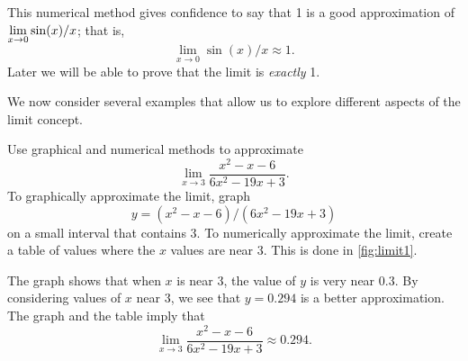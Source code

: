 This numerical method gives confidence to say that 1 is a good approximation of $\displaystyle\lim_{x\to 0} \sin(x)/x$; that is,\vspace{-.3\baselineskip}
\[\lim_{x\to 0} \sin(x)/x \approx 1.\]
Later we will be able to prove that the limit is \emph{exactly} 1.


We now consider several examples that allow us to explore different aspects of the limit concept.

\begin{example}\label{ex_limit1}%
Use graphical and numerical methods to approximate
\[\lim_{x\to 3} \frac{x^2-x-6}{6x^2-19x+3}.\]
\solution
To graphically approximate the limit, graph
\[y = (x^2-x-6)/(6x^2-19x+3)\]
on a small interval that contains 3. To numerically approximate the limit, create a table of values where the $x$ values are near 3. This is done in \autoref{fig:limit1}.


The graph shows that when $x$ is near 3, the value of $y$ is very near $0.3$. By considering values of $x$ near 3, we see that $y=0.294$ is a better approximation. The graph and the table imply that
\[\lim_{x\to 3} \frac{x^2-x-6}{6x^2-19x+3} \approx 0.294.\]
\end{example}

